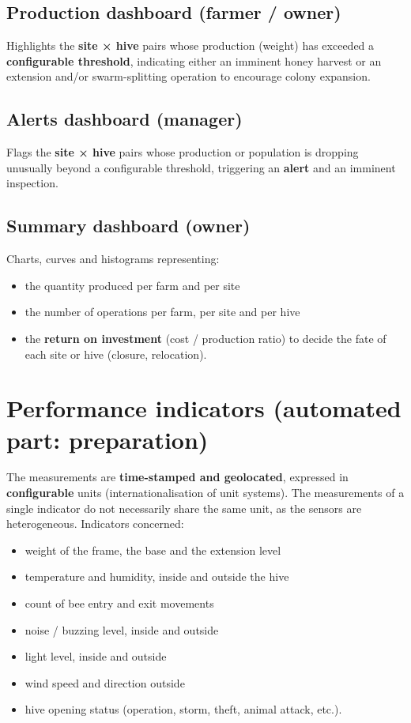\subsection{Production dashboard (farmer / owner)}
Highlights the \textbf{site × hive} pairs whose production (weight) has exceeded
a \textbf{configurable threshold}, indicating either an imminent honey harvest or
an extension and/or swarm-splitting operation to encourage colony expansion.

\subsection{Alerts dashboard (manager)}
Flags the \textbf{site × hive} pairs whose production or population is dropping
unusually beyond a configurable threshold, triggering an \textbf{alert} and an
imminent inspection.

\subsection{Summary dashboard (owner)}
Charts, curves and histograms representing:
\begin{itemize}
  \item the quantity produced per farm and per site
  \item the number of operations per farm, per site and per hive
  \item the \textbf{return on investment} (cost / production ratio) to decide
        the fate of each site or hive (closure, relocation).
\end{itemize}

\section{Performance indicators (automated part: preparation)}
The measurements are \textbf{time-stamped and geolocated}, expressed in
\textbf{configurable} units (internationalisation of unit systems). The
measurements of a single indicator do not necessarily share the same unit, as
the sensors are heterogeneous. Indicators concerned:
\begin{itemize}
  \item weight of the frame, the base and the extension level
  \item temperature and humidity, inside and outside the hive
  \item count of bee entry and exit movements
  \item noise / buzzing level, inside and outside
  \item light level, inside and outside
  \item wind speed and direction outside
  \item hive opening status (operation, storm, theft, animal attack, etc.).
\end{itemize}

